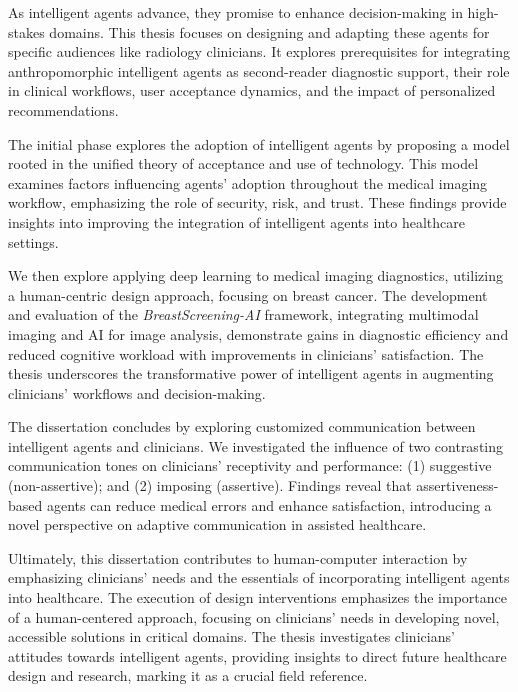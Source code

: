 
As intelligent agents advance, they promise to enhance decision-making in high-stakes domains.
This thesis focuses on designing and adapting these agents for specific audiences like radiology clinicians.
It explores prerequisites for integrating anthropomorphic intelligent agents as second-reader diagnostic support, their role in clinical workflows, user acceptance dynamics, and the impact of personalized recommendations.

The initial phase explores the adoption of intelligent agents by proposing a model rooted in the unified theory of acceptance and use of technology.
This model examines factors influencing agents' adoption throughout the medical imaging workflow, emphasizing the role of security, risk, and trust.
These findings provide insights into improving the integration of intelligent agents into healthcare settings.

We then explore applying deep learning to medical imaging diagnostics, utilizing a human-centric design approach, focusing on breast cancer.
The development and evaluation of the {\it BreastScreening-AI} framework, integrating multimodal imaging and AI for image analysis, demonstrate gains in diagnostic efficiency and reduced cognitive workload with improvements in clinicians' satisfaction.
The thesis underscores the transformative power of intelligent agents in augmenting clinicians' workflows and decision-making.

The dissertation concludes by exploring customized communication between intelligent agents and clinicians.
We investigated the influence of two contrasting communication tones on clinicians' receptivity and performance:
(1) suggestive (non-assertive); and
(2) imposing (assertive).
Findings reveal that assertiveness-based agents can reduce medical errors and enhance satisfaction, introducing a novel perspective on adaptive communication in assisted healthcare.

Ultimately, this dissertation contributes to human-computer interaction by emphasizing clinicians' needs and the essentials of incorporating intelligent agents into healthcare.
The execution of design interventions emphasizes the importance of a human-centered approach, focusing on clinicians' needs in developing novel, accessible solutions in critical domains.
The thesis investigates clinicians' attitudes towards intelligent agents, providing insights to direct future healthcare design and research, marking it as a crucial field reference.